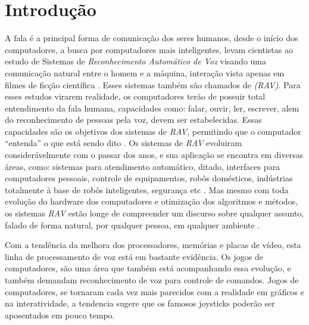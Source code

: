 \chapter{Introdução}

A fala é a principal forma de comunicação dos seres humanos, desde o início dos computadores, a busca por computadores mais inteligentes, levam cientistas ao estudo de Sistemas de \textit {Reconhecimento Automático de Voz} visando uma comunicação natural entre o homem e a máquina, interação vista apenas em filmes de ficção científica \cite{RavPtBrCarlos}. Esses sistemas também são chamados de \textit{(RAV)}. 
Para esses estudos virarem realidade, os computadores terão de possuir total entendimento da fala humana, capacidades como: falar, ouvir, ler, escrever, alem do reconhecimento de pessoas pela voz, devem ser estabelecidas. Essas capacidades são os objetivos dos sistemas de \textit{RAV}, permitindo que o computador “entenda” o que está sendo dito \cite{RavCorporaCarlos}.
Os sistemas de \textit{RAV} evoluiram considerávelmente com o passar dos anos, e sua aplicação se encontra em diversas áreas, como: sistemas para atendimento automático, ditado, interfaces para computadores pessoais, controle de equipamentos, robôs domésticos, indústrias totalmente à base de robôs inteligentes, segurança etc \cite{RavPtBrCarlos}. Mas mesmo com toda evolução do hardware dos computadores e otimização dos algoritmos e métodos, os sistemas \textit{RAV} estão longe de compreender um discurso sobre qualquer assunto, falado de forma natural, por qualquer pessoa, em qualquer ambiente \cite{RavIsolAnderson}. 

Com a tendência da melhora dos processadores, memórias e placas de vídeo, esta linha de processamento de voz está em bastante evidência. Os jogos de computadores, são uma área que também está acompanhando essa evolução, e também demandam reconhecimento de voz para controle de comandos. Jogos de computadores, se tornaram cada vez mais parecidos com a realidade em gráficos e na interatividade, a tendencia sugere que os famosos joysticks poderão ser aposentados em pouco tempo.

